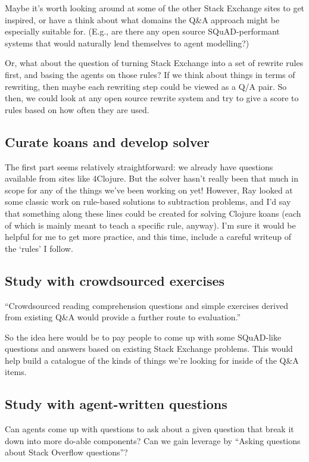 \documentclass[11pt]{article}
\begin{document}
Maybe it’s worth looking around at some of the other Stack Exchange
sites to get inspired, or have a think about what domains the Q\&A
approach might be especially suitable for.  (E.g., are there any open
source SQuAD-performant systems that would naturally lend themselves to agent
modelling?)

Or, what about the question of turning Stack Exchange into a set of
rewrite rules first, and basing the agents on those rules?  If we
think about things in terms of rewriting, then maybe each rewriting
step could be viewed as a Q/A pair.  So then, we could look at any
open source rewrite system and try to give a score to rules based on
how often they are used.
\subsection{Curate koans and develop solver}
\label{sec:org0c4ea4d}

The first part seems relatively straightforward: we already have
questions available from sites like 4Clojure.  But the solver hasn’t
really been that much in scope for any of the things we’ve been
working on yet!  However, Ray looked at some classic work on
rule-based solutions to subtraction problems, and I’d say that
something along these lines could be created for solving Clojure koans
(each of which is mainly meant to teach a specific rule, anyway).  I’m
sure it would be helpful for me to get more practice, and this time,
include a careful writeup of the ‘rules’ I follow.
\subsection{Study with crowdsourced exercises}
\label{sec:orga860b97}

“Crowdsourced reading comprehension questions and simple exercises
derived from existing Q\&A would provide a further route to
evaluation.”

So the idea here would be to pay people to come up with some
SQuAD-like questions and answers based on existing Stack Exchange
problems.  This would help build a catalogue of the kinds of things
we’re looking for inside of the Q\&A items.
\subsection{Study with agent-written questions}
\label{sec:org62f92b9}

Can agents come up with questions to ask about a given question that
break it down into more do-able components?  Can we gain leverage by
“Asking questions about Stack Overflow questions”?
\end{document}
